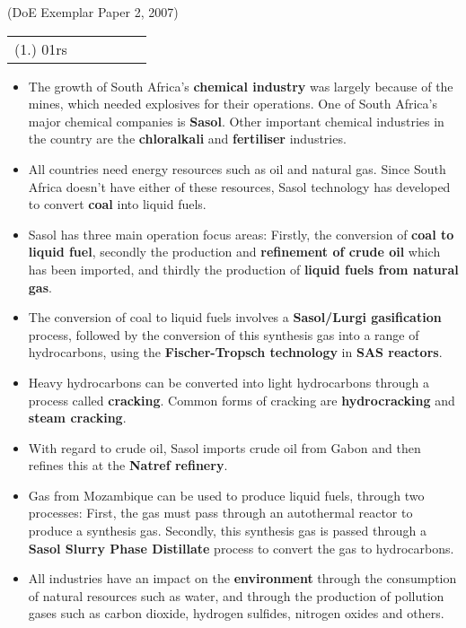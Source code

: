 {(DoE Exemplar Paper 2, 2007)

\par \practiceinfo
\par \begin{tabular}[h]{cccccc}
(1.)	01rs	&
\end{tabular}
}


\begin{itemize}
\item{The growth of South Africa's \textbf{chemical industry} was largely because of the mines, which needed explosives for their operations. One of South Africa's major chemical companies is \textbf{Sasol}. Other important chemical industries in the country are the \textbf{chloralkali} and \textbf{fertiliser} industries.}
\item{All countries need energy resources such as oil and natural gas. Since South Africa doesn't have either of these resources, Sasol technology has developed to convert \textbf{coal} into liquid fuels.}
\item{Sasol has three main operation focus areas: Firstly, the conversion of \textbf{coal to liquid fuel}, secondly the production and \textbf{refinement of crude oil} which has been imported, and thirdly the production of \textbf{liquid fuels from natural gas}.}
\item{The conversion of coal to liquid fuels involves a \textbf{Sasol/Lurgi gasification} process, followed by the conversion of this synthesis gas into a range of hydrocarbons, using the \textbf{Fischer-Tropsch technology} in \textbf{SAS reactors}.}
\item{Heavy hydrocarbons can be converted into light hydrocarbons through a process called \textbf{cracking}. Common forms of cracking are \textbf{hydrocracking} and \textbf{steam cracking}.}
\item{With regard to crude oil, Sasol imports crude oil from Gabon and then refines this at the \textbf{Natref refinery}.}
\item{Gas from Mozambique can be used to produce liquid fuels, through two processes: First, the gas must pass through an autothermal reactor to produce a synthesis gas. Secondly, this synthesis gas is passed through a \textbf{Sasol Slurry Phase Distillate} process to convert the gas to hydrocarbons.}
\item{All industries have an impact on the \textbf{environment} through the consumption of natural resources such as water, and through the production of pollution gases such as carbon dioxide, hydrogen sulfides, nitrogen oxides and others.}

\end{itemize}
